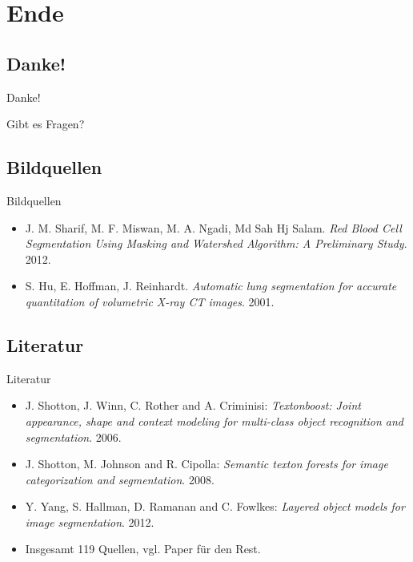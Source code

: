 \section{Ende}
\subsection{Danke!}
\begin{frame}{Danke!}
    \begin{center}
        \Huge
	    Gibt es Fragen?
    \end{center}
\end{frame}

\subsection{Bildquellen}
\begin{frame}{Bildquellen}
\begin{itemize}
	\item J. M. Sharif, M. F. Miswan, M. A. Ngadi, Md Sah Hj Salam.
          \textit{Red Blood Cell Segmentation Using Masking and Watershed Algorithm: A Preliminary Study}. 2012.
    \item S. Hu, E. Hoffman, J. Reinhardt. \textit{Automatic lung segmentation for accurate quantitation of volumetric X-ray CT images}. 2001.
\end{itemize}
\end{frame}

\subsection{Literatur}
\begin{frame}{Literatur}
\begin{itemize}
    \item J. Shotton, J. Winn, C. Rother and  A. Criminisi: \textit{Textonboost: Joint appearance, shape and context modeling for multi-class object recognition and segmentation}. 2006.
    \item J. Shotton, M. Johnson and R. Cipolla: \textit{Semantic texton forests for image categorization and segmentation}. 2008.
    \item Y. Yang, S. Hallman, D. Ramanan and C. Fowlkes: \textit{Layered object models for image segmentation}. 2012.
    \item Insgesamt 119 Quellen, vgl. Paper für den Rest.
\end{itemize}
\end{frame}

